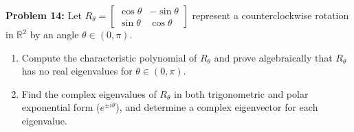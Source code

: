 \documentclass[11pt, letterpaper]{article}
\theoremstyle{definition}
\theoremstyle{remark}
\begin{document}
\vspace{0.4em}
\textbf{Problem 14:}
Let $R_\theta = \begin{bmatrix} \cos\theta & -\sin\theta \\ \sin\theta & \cos\theta \end{bmatrix}$ represent a counterclockwise rotation in $\mathbb{R}^2$ by an angle $\theta \in (0, \pi)$.
\begin{enumerate}[label=(\alph*)]
    \item Compute the characteristic polynomial of $R_\theta$ and prove algebraically that $R_\theta$ has no real eigenvalues for $\theta \in (0, \pi)$.
    \item Find the complex eigenvalues of $R_\theta$ in both trigonometric and polar exponential form ($e^{\pm i\theta}$), and determine a complex eigenvector for each eigenvalue.
\end{enumerate}
\end{document}
